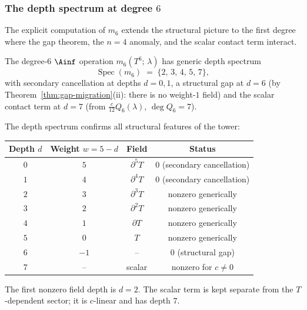 \subsubsection*{The depth spectrum at degree $6$}

The explicit computation of $m_6$ extends the structural picture
to the first degree where the gap theorem, the $n = 4$ anomaly,
and the scalar contact term interact.

\begin{computation}
\label{comp:m6-depth-spectrum}%
%
The degree-$6$ $\Ainf$ operation $m_6(T^6;\,\lambda)$ has generic
depth spectrum
\begin{equation}\label{eq:m6-depth-spectrum}
\operatorname{Spec}(m_6)
\;=\;
\{2,\, 3,\, 4,\, 5,\, 7\},
\end{equation}
with secondary cancellation at depths $d=0,1$, a structural gap at
$d = 6$ \textup{(}by
Theorem~\textup{\ref{thm:gap-migration}(ii)}: there is no
weight-$1$ field\textup{)} and the scalar contact term at $d = 7$
\textup{(}from $\frac{c}{12}Q_6(\lambda)$, $\deg Q_6 = 7$\textup{)}.

The depth spectrum confirms all structural features of the tower:
\begin{center}
\small
\renewcommand{\arraystretch}{1.2}
\begin{tabular}{@{}cccc@{}}
\textbf{Depth $d$} & \textbf{Weight $w = 5 - d$}
 & \textbf{Field} & \textbf{Status} \\
\hline
$0$ & $5$ & $\partial^5 T$ & $0$ \textup{(secondary cancellation)} \\
$1$ & $4$ & $\partial^4 T$ & $0$ \textup{(secondary cancellation)} \\
$2$ & $3$ & $\partial^3 T$ & nonzero generically \\
$3$ & $2$ & $\partial^2 T$ & nonzero generically \\
$4$ & $1$ & $\partial T$ & nonzero generically \\
$5$ & $0$ & $T$ & nonzero generically \\
$6$ & $-1$ & \textup{--} & $0$ \textup{(structural gap)} \\
$7$ & \textup{--} & scalar & nonzero for \(c\ne0\)
\end{tabular}
\end{center}
The first nonzero field depth is \(d=2\). The scalar term is kept
separate from the \(T\)-dependent sector; it is \(c\)-linear and has
depth \(7\).


\end{computation}
